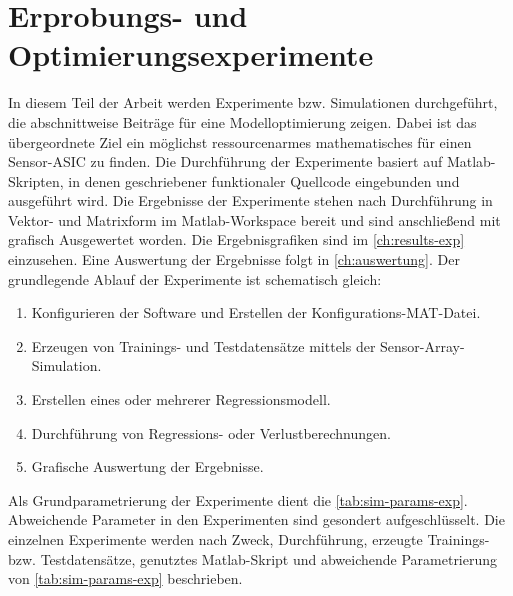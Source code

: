 %

\chapter{Erprobungs- und Optimierungsexperimente}\label{ch:erprobungs-u-opt-exp}


In diesem Teil der Arbeit werden Experimente bzw. Simulationen durchgeführt, die abschnittweise Beiträge für eine Modelloptimierung zeigen. Dabei ist das übergeordnete Ziel ein möglichst ressourcenarmes mathematisches für einen Sensor-ASIC zu finden. Die Durchführung der Experimente basiert auf Matlab-Skripten, in denen geschriebener funktionaler Quellcode eingebunden und ausgeführt wird. Die Ergebnisse der Experimente stehen nach Durchführung in Vektor- und Matrixform im Matlab-Workspace bereit und sind anschließend mit grafisch Ausgewertet worden. Die Ergebnisgrafiken sind im \autoref{ch:results-exp} einzusehen. Eine Auswertung der Ergebnisse folgt in \autoref{ch:auswertung}. Der grundlegende Ablauf der Experimente ist schematisch gleich:


\begin{enumerate}
	\item Konfigurieren der Software und Erstellen der Konfigurations-MAT-Datei.
	\item Erzeugen von Trainings- und Testdatensätze mittels der Sensor-Array-Simulation.
	\item Erstellen eines oder mehrerer Regressionsmodell.
	\item Durchführung von Regressions- oder Verlustberechnungen.
	\item Grafische Auswertung der Ergebnisse.
\end{enumerate}


Als Grundparametrierung der Experimente dient die \autoref{tab:sim-params-exp}. Abweichende Parameter in den Experimenten sind gesondert aufgeschlüsselt. Die einzelnen Experimente werden nach Zweck, Durchführung, erzeugte Trainings- bzw. Testdatensätze, genutztes Matlab-Skript und abweichende Parametrierung von \autoref{tab:sim-params-exp} beschrieben.


\clearpage


